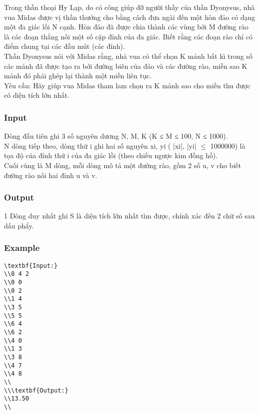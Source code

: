 



   Trong thần thoại Hy Lạp, do có công giúp đỡ người thầy của thần Dyonysus, nhà vua Midas được vị thần thưởng cho bằng  cách đưa ngài đến một hòn đảo có dạng một đa giác lồi N cạnh. Hòn đảo đã được chia thành các vùng bởi M đường rào là các đoạn thẳng nối một số cặp đỉnh của đa giác. Biết rằng các đoạn rào chỉ có điểm chung tại các đầu mút (các đỉnh).   
\\   Thần Dyonysus nói với Midas rằng, nhà vua có thể chọn K mảnh bất kì trong số các mảnh đã được tạo ra bởi đường biên của đảo và các đường rào, miễn sao K mảnh đó phải ghép lại thành một miền liên tục.   
\\   Yêu cầu: Hãy giúp vua Midas tham lam chọn ra K mảnh sao cho miền thu được có diện tích lớn nhất.  

\subsubsection{   Input  }

   Dòng đầu tiên ghi 3 số nguyên dương N, M, K (K ≤ M ≤ 100, N ≤ 1000).   
\\   N dòng tiếp theo, dòng thứ i ghi hai số nguyên xi, yi ( |xi|, |yi|  $\le$  1000000) là tọa độ của đỉnh thứ i của đa giác lồi (theo chiều ngược kim đồng hồ).   
\\   Cuối cùng là M dòng, mỗi dòng mô tả một đường rào, gồm 2 số u, v cho biết đường rào nối hai đỉnh u và v.  

\subsubsection{   Output  }

   1 Dòng duy nhất ghi S là diện tích lớn nhất tìm được, chính xác đến 2 chữ số sau dấu phẩy.  

\subsubsection{   Example  }
\begin{verbatim}
\textbf{Input:}
\\8 4 2
\\0 0
\\0 2
\\1 4
\\3 5
\\5 5
\\6 4
\\6 2
\\4 0
\\1 3
\\3 8
\\4 7
\\4 8
\\
\\\textbf{Output:}
\\13.50
\\\end{verbatim}
